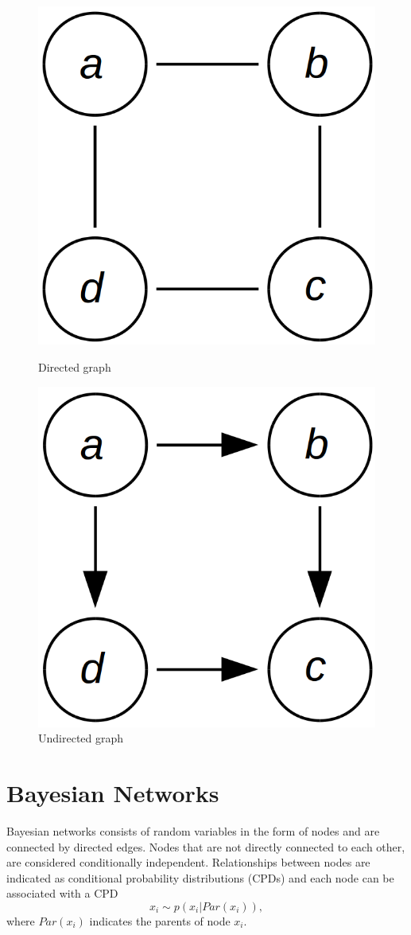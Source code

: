 \documentclass[12pt,oneside,openany,a4paper, %
afrikaans,english,
]{memoir}
\numberwithin{equation}{chapter}
\begin{document}
\begin{figure}[htbp]
  \begin{minipage}[b]{0.5\linewidth}
    \centering
    \includegraphics[width=0.5\linewidth]{Figures/undirected_graph.png}
    \caption{Directed graph}
    \label{fig:directed_graph}
  \end{minipage}
  \hspace{0.5cm}
  \begin{minipage}[b]{0.5\linewidth}
    \centering
    \includegraphics[width=0.5\linewidth]{Figures/directed_graph.png}
    \caption{Undirected graph}
    \label{fig:undirected_graph}
  \end{minipage}
\end{figure}

\section{Bayesian Networks}
Bayesian networks consists of random variables in the form of nodes and are connected by directed edges. Nodes that are not directly connected to each other, are considered conditionally independent. Relationships between nodes are indicated as conditional probability distributions (CPDs) and each node can be associated with a CPD
\begin{equation}
x_i \sim p(x_i|Par(x_i)),
\end{equation}
where $Par(x_i)$ indicates the parents of node $x_i$.
\end{document}
